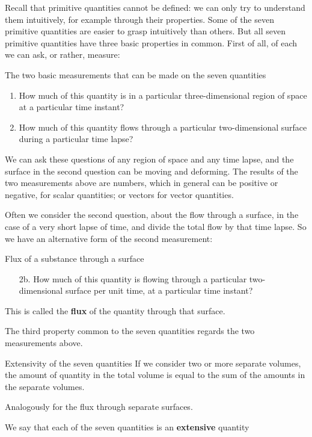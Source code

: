 \documentclass[a4paper,12pt,%
onecolumn,oneside,titlepage,%
british%
]{memoir}
\newcommand{\mynotew}[1]{{\footnotesize\color{midgrey}\faIcon{tools}\ #1}}
\renewcommand*{\|}[1][]{\nonscript\:#1\vert\nonscript\:\mathopen{}}
\begin{document}
\medskip

Recall that primitive quantities cannot be defined: we can only try to understand them intuitively, for example through their properties. Some of the seven primitive quantities are easier to grasp intuitively than others. But all seven primitive quantities have three basic properties in common. First of all, of each we can ask, or rather, measure:
\begin{definition}{The two basic measurements that can be made on the seven quantities}
  \begin{enumerate}[shift,label=\arabic*.]\bfseries
  \item How much of this quantity is in a particular three-dimensional region of space at a particular time instant?
  \item How much of this quantity flows through a particular two-dimensional surface during a particular time lapse?
  \end{enumerate}
\end{definition}
We can ask these questions of any region of space and any time lapse, and the surface in the second question can be moving and deforming.
The results of the two measurements above are numbers, which in general can be positive or negative, for scalar quantities; or vectors for vector quantities.

Often we consider the second question, about the flow through a surface, in the case of a very short lapse of time, and divide the total flow by that time lapse. So we have an alternative form of the second measurement:
\begin{definition}{Flux of a substance through a surface}
  \begin{enumerate}[shift,label=\arabic*.]\bfseries
  \item[2b.] How much of this quantity is flowing through a particular two-dimensional surface per unit time, at a particular time instant?
  \end{enumerate}
\end{definition}
This is called the \textbf{flux} of the quantity through that surface.

The third  property common to the seven quantities regards the two measurements above.
\begin{definition}{Extensivity of the seven quantities}\label{def:extensivity}
  If we consider two or more separate volumes, the amount of quantity in the total volume is equal to the sum of the amounts in the separate volumes.

  Analogously for the flux through separate surfaces.
\end{definition}
We say that each of the seven quantities is an \textbf{extensive} quantity
\end{document}
